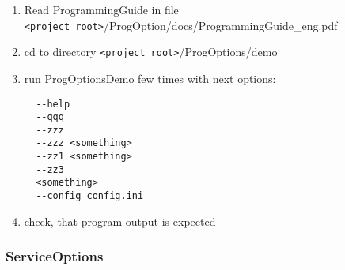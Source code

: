 \documentclass[10pt]{article}
\begin{document}
\begin{enumerate}
 \item Read ProgrammingGuide in file \newline
 \verb|<project_root>|/ProgOption/docs/ProgrammingGuide\_eng.pdf
 \item cd to directory \verb|<project_root>|/ProgOptions/demo
 \item run  ProgOptionsDemo few times with next options:
 \begin{verbatim}
  --help
  --qqq
  --zzz
  --zzz <something>
  --zz1 <something> 
  --zz3
  <something>
  --config config.ini
 \end{verbatim}
 \item check, that program output is expected
\end{enumerate}

\subsubsection{ ServiceOptions }
\end{document}
